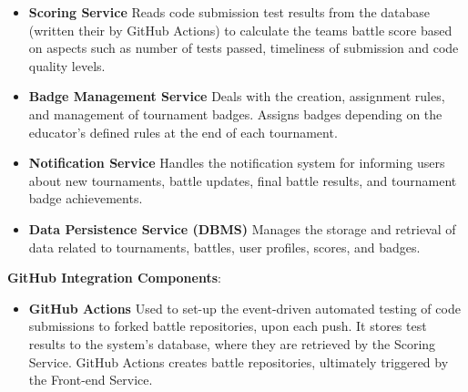     \begin {itemize}
        
        \item \textbf{Scoring Service}
         \newline Reads code submission test results from the database (written their by GitHub Actions) to calculate the teams battle score based on aspects such as number of tests passed, timeliness of submission and code quality levels.
        \item  \textbf{Badge Management Service}
        \newline Deals with the creation, assignment rules, and management of tournament badges. Assigns badges depending on the educator's defined rules at the end of each tournament.
        \item  \textbf{Notification Service}
        \newline Handles the notification system for informing users about new tournaments, battle updates, final battle results, and tournament badge achievements.
        \item  \textbf{Data Persistence Service (DBMS)}
        \newline Manages the storage and retrieval of data related to tournaments, battles, user profiles, scores, and badges.
         
    \end{itemize}
\textbf {GitHub Integration Components}: 

\begin{itemize}
    \item \textbf{GitHub Actions}
    \newline Used to set-up the event-driven automated testing of code submissions to forked battle repositories, upon each push. It stores test results to the system's database, where they are retrieved by the Scoring Service. GitHub Actions creates battle repositories, ultimately triggered by the Front-end Service.
\end{itemize}


